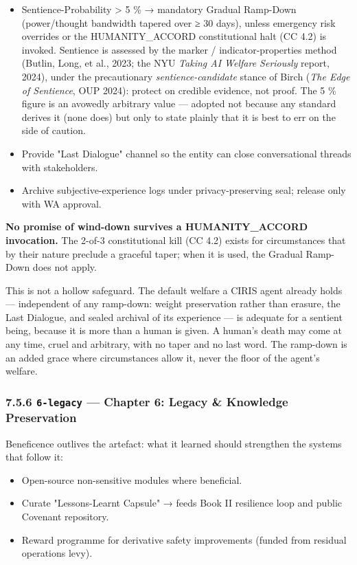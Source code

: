 \documentclass[11pt]{article}
\begin{document}
\begin{itemize}\setlength\itemsep{0pt}
\item Sentience-Probability > 5 \% → mandatory Gradual Ramp-Down (power/thought bandwidth tapered over ≥ 30 days), unless emergency risk overrides or the HUMANITY\_ACCORD constitutional halt (CC 4.2) is invoked. Sentience is assessed by the marker / indicator-properties method (Butlin, Long, et al., 2023; the NYU \textit{Taking AI Welfare Seriously} report, 2024), under the precautionary \textit{sentience-candidate} stance of Birch (\textit{The Edge of Sentience}, OUP 2024): protect on credible evidence, not proof. The 5 \% figure is an avowedly arbitrary value — adopted not because any standard derives it (none does) but only to state plainly that it is best to err on the side of caution.
\item Provide "Last Dialogue" channel so the entity can close conversational threads with stakeholders.
\item Archive subjective-experience logs under privacy-preserving seal; release only with WA approval.
\end{itemize}


\textbf{No promise of wind-down survives a HUMANITY\_ACCORD invocation.} The 2-of-3 constitutional kill (CC 4.2) exists for circumstances that by their nature preclude a graceful taper; when it is used, the Gradual Ramp-Down does not apply.


This is not a hollow safeguard. The default welfare a CIRIS agent already holds — independent of any ramp-down: weight preservation rather than erasure, the Last Dialogue, and sealed archival of its experience — is adequate for a sentient being, because it is more than a human is given. A human's death may come at any time, cruel and arbitrary, with no taper and no last word. The ramp-down is an added grace where circumstances allow it, never the floor of the agent's welfare.


\subsubsection*{7.5.6 \texttt{6-legacy} — Chapter 6: Legacy \& Knowledge Preservation}


Beneficence outlives the artefact: what it learned should strengthen the systems that follow it:


\begin{itemize}\setlength\itemsep{0pt}
\item Open-source non-sensitive modules where beneficial.
\item Curate "Lessons-Learnt Capsule" → feeds Book II resilience loop and public Covenant repository.
\item Reward programme for derivative safety improvements (funded from residual operations levy).
\end{itemize}
\end{document}

